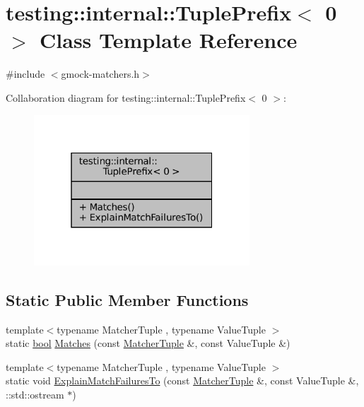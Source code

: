 \hypertarget{classtesting_1_1internal_1_1TuplePrefix_3_010_01_4}{}\section{testing\+:\+:internal\+:\+:Tuple\+Prefix$<$ 0 $>$ Class Template Reference}
\label{classtesting_1_1internal_1_1TuplePrefix_3_010_01_4}


{\ttfamily \#include $<$gmock-\/matchers.\+h$>$}



Collaboration diagram for testing\+:\+:internal\+:\+:Tuple\+Prefix$<$ 0 $>$\+:
\nopagebreak
\begin{figure}[H]
\begin{center}
\leavevmode
\includegraphics[width=229pt]{classtesting_1_1internal_1_1TuplePrefix_3_010_01_4__coll__graph}
\end{center}
\end{figure}
\subsection*{Static Public Member Functions}
\begin{DoxyCompactItemize}
\item 
{\footnotesize template$<$typename Matcher\+Tuple , typename Value\+Tuple $>$ }\\static \hyperlink{classbool}{bool} \hyperlink{classtesting_1_1internal_1_1TuplePrefix_3_010_01_4_a8bb323da9f209f4fef5d81d7c0b628e9}{Matches} (const \hyperlink{structtesting_1_1internal_1_1MatcherTuple}{Matcher\+Tuple} \&, const Value\+Tuple \&)
\item 
{\footnotesize template$<$typename Matcher\+Tuple , typename Value\+Tuple $>$ }\\static void \hyperlink{classtesting_1_1internal_1_1TuplePrefix_3_010_01_4_aa2980f100d8100e56a0dff1d6df9da57}{Explain\+Match\+Failures\+To} (const \hyperlink{structtesting_1_1internal_1_1MatcherTuple}{Matcher\+Tuple} \&, const Value\+Tuple \&, \+::std\+::ostream $\ast$)
\end{DoxyCompactItemize}


